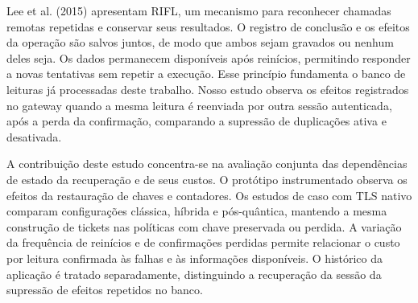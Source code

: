 Lee et al. (2015) \cite{lee2015rifl} apresentam RIFL, um mecanismo para reconhecer chamadas remotas repetidas e conservar seus resultados. O registro de conclusão e os efeitos da operação são salvos juntos, de modo que ambos sejam gravados ou nenhum deles seja. Os dados permanecem disponíveis após reinícios, permitindo responder a novas tentativas sem repetir a execução. Esse princípio fundamenta o banco de leituras já processadas deste trabalho. Nosso estudo observa os efeitos registrados no gateway quando a mesma leitura é reenviada por outra sessão autenticada, após a perda da confirmação, comparando a supressão de duplicações ativa e desativada.

A contribuição deste estudo concentra-se na avaliação conjunta das dependências de estado da recuperação e de seus custos. O protótipo instrumentado observa os efeitos da restauração de chaves e contadores. Os estudos de caso com TLS nativo comparam configurações clássica, híbrida e pós-quântica, mantendo a mesma construção de tickets nas políticas com chave preservada ou perdida. A variação da frequência de reinícios e de confirmações perdidas permite relacionar o custo por leitura confirmada às falhas e às informações disponíveis. O histórico da aplicação é tratado separadamente, distinguindo a recuperação da sessão da supressão de efeitos repetidos no banco.
